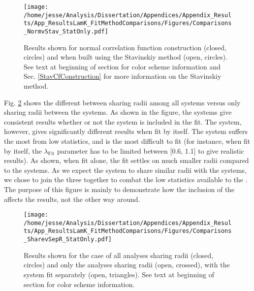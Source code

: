 \documentclass[/home/jesse/Analysis/FemtoAnalysis/AnalysisNotes/AnalysisNoteJBuxton.tex]{subfiles}
\begin{document}
\begin{figure}[h]
  \centering
  \texttt{[image: /home/jesse/Analysis/Dissertation/Appendices/Appendix\_Results/App\_ResultsLamK\_FitMethodComparisons/Figures/Comparisons\_NormvStav\_StatOnly.pdf]}
  \caption[Fit comparison: normal CF construction vs. Staninskiy method]
  {
  Results shown for normal correlation function construction (closed, circles) and when built using the Stavinskiy method (open, circles).
  See text at beginning of section for color scheme information and Sec. \ref{StavCfConstruction} for more information on the Stavinskiy method.
  }
  \label{figApp:Comparisons_NormvStav}
\end{figure}


Fig. \ref{figApp:Comparisons_SharevSepR} shows the different between sharing radii among all \LamK systems versus only sharing radii between the \LamKpm systems.
As shown in the figure, the \LamKpm systems give consistent results whether or not the \LamKs system is included in the fit.
The \LamKs system, however, gives significantly different results when fit by itself.
The \LamKs system suffers the most from low statistics, and is the most difficult to fit (for instance, when fit by itself, the $\lambda_{\mathrm{Fit}}$ parameter has to be limited between [0.6, 1.1] to give realistic results).
As shown, when fit alone, the \LamKs fit settles on much smaller radii compared to the \LamKpm systems.
As we expect the \LamKs system to share similar radii with the \LamKpm systems, we chose to join the three together to combat the low statistics available to the \LamKs.
The purpose of this figure is mainly to demonstrate how the inclusion of the \LamKs affects the \LamKpm results, not the other way around.

\begin{figure}[h]
  \centering
  \texttt{[image: /home/jesse/Analysis/Dissertation/Appendices/Appendix\_Results/App\_ResultsLamK\_FitMethodComparisons/Figures/Comparisons\_SharevSepR\_StatOnly.pdf]}
  \caption[Fit comparison: shared vs. separate radii]
  {
  Results shown for the case of all \LamK analyses sharing radii (closed, circles) and only the \LamKpm analyses sharing radii (open, crossed), with the \LamKs system fit separately (open, triangles).
  See text at beginning of section for color scheme information.
  }
  \label{figApp:Comparisons_SharevSepR}
\end{figure}
\end{document}
